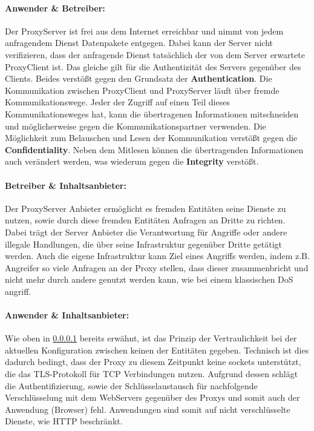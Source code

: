 \documentclass[12pt, a4paper]{scrartcl}
\begin{document}
\paragraph{Anwender \& Betreiber:}\label{ssec::anwender}
\noindent Der ProxyServer ist frei aus dem Internet erreichbar und nimmt von jedem anfragendem Dienst Datenpakete entgegen. Dabei kann der Server nicht verifizieren, dass der anfragende Dienst tatsächlich der von dem Server erwartete ProxyClient ist. Das gleiche gilt für die Authentizität des Servers gegenüber des Clients. Beides verstößt gegen den Grundsatz der \textbf{Authentication}.\newline
Die Kommunikation zwischen ProxyClient und ProxyServer läuft über fremde Kommunikationswege. Jeder der Zugriff auf einen Teil dieses Kommunikationsweges hat, kann die übertragenen Informationen mitschneiden und möglicherweise gegen die Kommunikationspartner verwenden. Die Möglichkeit zum Belauschen und Lesen der Kommunikation verstößt gegen die \textbf{Confidentiality}.\newline
Neben dem Mitlesen können die übertragenden Informationen auch verändert werden, was wiederum gegen die \textbf{Integrity} verstößt.
\paragraph{Betreiber \& Inhaltsanbieter:}
Der ProxyServer Anbieter ermöglicht es fremden Entitäten seine Dienste zu nutzen, sowie durch diese fremden Entitäten Anfragen an Dritte zu richten. Dabei trägt der Server Anbieter die Verantwortung für Angriffe oder andere illegale Handlungen, die über seine Infrastruktur gegenüber Dritte getätigt werden.\newline
Auch die eigene Infrastruktur kann Ziel eines Angriffs werden, indem z.B. Angreifer so viele Anfragen an der Proxy stellen, dass dieser zusammenbricht und nicht mehr durch andere genutzt werden kann, wie bei einem klassischen \ac{DoS} angriff.
\paragraph{Anwender \& Inhaltsanbieter:}
Wie oben in \ref{ssec::anwender} bereits erwähnt, ist das Prinzip der Vertraulichkeit bei der aktuellen Konfiguration zwischen keinen der Entitäten gegeben. Technisch ist dies dadurch bedingt, dass der Proxy zu diesem Zeitpunkt keine sockets unterstützt, die das \ac{TLS}-Protokoll für TCP Verbindungen nutzen. Aufgrund dessen schlägt die Authentifizierung, sowie der Schlüsselaustausch für nachfolgende Verschlüsselung mit dem WebServers gegenüber des Proxys und somit auch der Anwendung (Browser) fehl. Anwendungen sind somit auf nicht verschlüsselte Dienste, wie \acs{HTTP} beschränkt.
\end{document}

